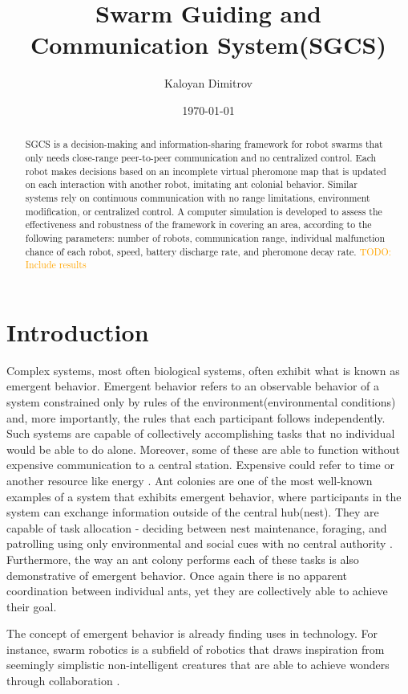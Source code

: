 \documentclass[a4paper, 12pt, twocolumn, times]{article}
\author{Kaloyan Dimitrov}
\title{Swarm Guiding and Communication System(SGCS)}
\date{\today}
\newcommand{\todo}[1]{\textcolor{orange}{TODO: #1}}
\begin{document}
\maketitle
\begin{abstract}
SGCS is a decision-making and information-sharing framework for robot swarms that only needs close-range peer-to-peer communication and no centralized control. Each robot makes decisions based on an incomplete virtual pheromone map that is updated on each interaction with another robot, imitating ant colonial behavior. Similar systems rely on continuous communication with no range limitations, environment modification, or centralized control. A computer simulation is developed to assess the effectiveness and robustness of the framework in covering an area, according to the following parameters: number of robots, communication range, individual malfunction chance of each robot, speed, battery discharge rate, and pheromone decay rate. \todo{Include results}
\end{abstract}
\section{Introduction}
Complex systems, most often biological systems, often exhibit what is known as emergent behavior. Emergent behavior refers to an observable behavior of a system constrained only by rules of the environment(environmental conditions) and, more importantly, the rules that each participant follows independently. Such systems are capable of collectively accomplishing tasks that no individual would be able to do alone. Moreover, some of these are able to function without expensive communication to a central station. Expensive could refer to time or another resource like energy \parencite{marsh_demystification_2009}. Ant colonies are one of the most well-known examples of a system that exhibits emergent behavior, where participants in the system can exchange information outside of the central hub(nest). They are capable of task allocation - deciding between nest maintenance, foraging, and patrolling using only environmental and social cues with no central authority \parencite{gordon_organization_1996}. Furthermore, the way an ant colony performs each of these tasks is also demonstrative of emergent behavior. Once again there is no apparent coordination between individual ants, yet they are collectively able to achieve their goal.
\par The concept of emergent behavior is already finding uses in technology. For instance, swarm robotics is a subfield of robotics that draws inspiration from seemingly simplistic non-intelligent creatures that are able to achieve wonders through collaboration \parencite{schranz_swarm_2020}.
\end{document}
